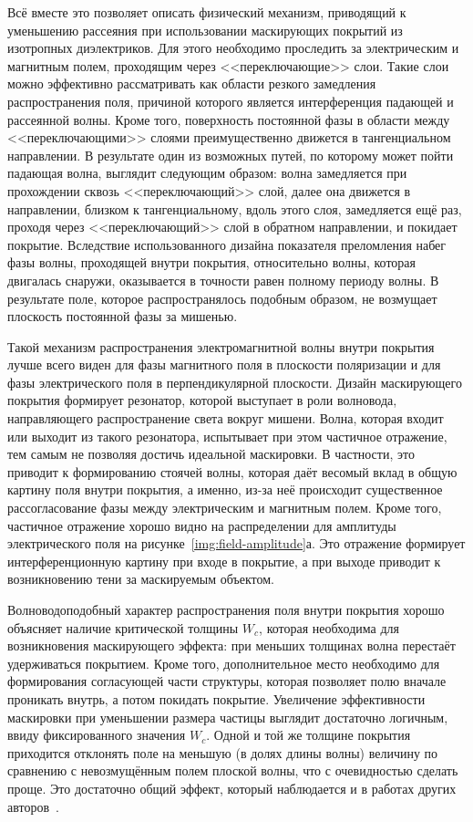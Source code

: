 Всё вместе это позволяет описать физический механизм, приводящий к
уменьшению рассеяния при использовании маскирующих покрытий из
изотропных диэлектриков. Для этого необходимо проследить за
электрическим и магнитным полем, проходящим через <<переключающие>>
слои.  Такие слои можно эффективно рассматривать как области резкого
замедления распространения поля, причиной которого является
интерференция падающей и рассеянной волны.  Кроме того, поверхность
постоянной фазы в области между <<переключающими>> слоями
преимущественно движется  в тангенциальном направлении.
В результате один из возможных путей, по которому может пойти
падающая волна, выглядит следующим образом: волна замедляется при
прохождении сквозь <<переключающий>> слой, далее она движется в
направлении, близком к тангенциальному, вдоль этого слоя, замедляется
ещё раз, проходя через <<переключающий>> слой в обратном направлении, и
покидает покрытие.  Вследствие использованного дизайна показателя
преломления набег фазы волны, проходящей внутри покрытия, относительно
волны, которая двигалась снаружи, оказывается в точности равен полному
периоду волны.  В результате поле, которое распространялось подобным
образом, не возмущает плоскость постоянной фазы за мишенью.

Такой механизм распространения электромагнитной волны внутри покрытия
лучше всего виден для фазы магнитного поля в плоскости поляризации и
для фазы электрического поля в перпендикулярной плоскости. Дизайн
маскирующего покрытия формирует резонатор, которой выступает в роли
волновода, направляющего распространение света вокруг мишени. Волна,
которая входит или выходит из такого резонатора, испытывает при этом
частичное отражение, тем самым не позволяя достичь идеальной
маскировки. В частности, это приводит к формированию стоячей волны,
которая даёт весомый вклад в общую картину поля внутри покрытия, а
именно, из-за неё происходит существенное рассогласование фазы между
электрическим и магнитным полем. Кроме того, частичное отражение
хорошо видно на распределении для амплитуды электрического поля на
рисунке~\ref{img:field-amplitude}а. Это
отражение формирует интерференционную картину при входе в покрытие, а
при выходе приводит к возникновению тени за маскируемым объектом.

Волноводоподобный характер распространения поля внутри покрытия хорошо
объясняет наличие критической толщины $W_c$, которая необходима для
возникновения маскирующего эффекта: при меньших толщинах волна
перестаёт удерживаться покрытием. Кроме того, дополнительное место
необходимо для формирования согласующей части структуры, которая
позволяет полю вначале проникать внутрь, а потом покидать
покрытие. Увеличение эффективности маскировки при уменьшении размера
частицы выглядит достаточно логичным, ввиду фиксированного значения
$W_c$.  Одной и той же толщине покрытия приходится отклонять поле на
меньшую (в долях длины волны) величину по сравнению с невозмущённым
полем плоской волны, что с очевидностью сделать проще. Это достаточно
общий эффект, который наблюдается и в работах других
авторов~\cite{Alu-2005,Semouchkina-2013}.

